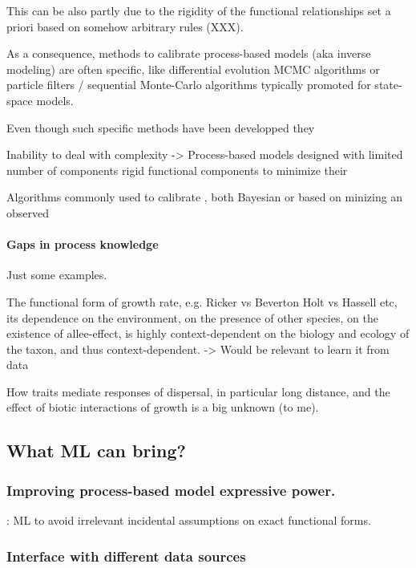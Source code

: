 This can be also partly due to the rigidity of the functional relationships set a priori based on somehow arbitrary rules (XXX). 

As a consequence, methods to calibrate process-based models (aka inverse modeling) are often specific, like differential evolution MCMC algorithms or particle filters / sequential Monte-Carlo algorithms typically promoted for state-space models.

Even though such specific methods have been developped they  

Inability to deal with complexity -> Process-based models designed with limited number of components rigid functional components to minimize their 

Algorithms commonly used to calibrate , both Bayesian or based on minizing an observed 

\paragraph{Gaps in process knowledge}

Just some examples.

The functional form of growth rate, e.g. Ricker vs Beverton Holt vs Hassell etc, its dependence on the environment, on the presence of other species, on the existence of allee-effect, is highly context-dependent on the biology and ecology of the taxon, and thus context-dependent. -> Would be relevant to learn it from data

How traits mediate responses of dispersal, in particular long distance, and the effect of biotic interactions of growth is a big unknown (to me).


\subsection{What ML can bring?} %

\subsubsection{Improving process-based model expressive power.}
\cite{wood2001}: ML to avoid irrelevant incidental assumptions on exact functional forms.

\subsubsection{Interface with different data sources}

